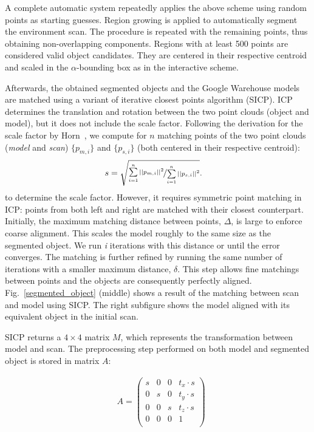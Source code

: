 \documentclass{llncs}
\begin{document}
A complete automatic system repeatedly applies the above scheme using
random points as starting guesses. Region growing is applied to
automatically segment the environment scan. The procedure is repeated
with the remaining points, thus obtaining non-overlapping
components. Regions with at least 500 points are considered valid
object candidates. They are centered in their respective centroid and
scaled in the $\alpha$-bounding box as in the interactive scheme.

Afterwards, the obtained segmented objects and the Google Warehouse
models are matched using a variant of iterative closest points
algorithm (SICP). ICP determines the translation and rotation between
the two point clouds (object and model), but it does not include the
scale factor. Following the derivation for the scale factor by
Horn~\cite{Horn:1987}, we compute for $n$ matching points of the two
point clouds (\emph{model} and \emph{scan}) $\{p_{m,i}\}$ and $\{p_{s,
  i}\}$ (both centered in their respective centroid):
%
\begin{align*}
  & s = \sqrt{\nicefrac{\sum\limits_{i=1}^n ||p_{m,i}||^2}{\sum\limits_{i=1}^n ||p_{s,i}||^2}}.
\end{align*}
to determine the scale factor. However, it requires symmetric point
matching in ICP: points from both left and right are matched with
their closest counterpart. Initially, the maximum matching distance
between points, $\Delta$, is large to enforce coarse alignment. This
scales the model roughly to the same size as the segmented object. We
run \emph{i} iterations with this distance or until the error
converges. The matching is further refined by running the same number
of iterations with a smaller maximum distance, $\delta$. This step
allows fine matchings between points and the objects are consequently
perfectly aligned. Fig.~\ref{segmented_object} (middle) shows a
result of the matching between scan and model using SICP.  The right
subfigure shows the model aligned with its equivalent object in the
initial scan.

\iffalse
SICP returns a $4 \times 4$ matrix $M$, which represents the transformation between model and scan. The preprocessing step performed on both model and segmented object is stored in matrix $A$:

\begin{align*}
	& A = \begin{pmatrix}
		s & 0 & 0 & t_x \cdot s \\
		0 & s & 0 & t_y \cdot s \\
		0 & 0 & s & t_z \cdot s \\ 
		0 & 0 & 0 & 1 \\
		\end{pmatrix}
\end{align*}
\end{document}
